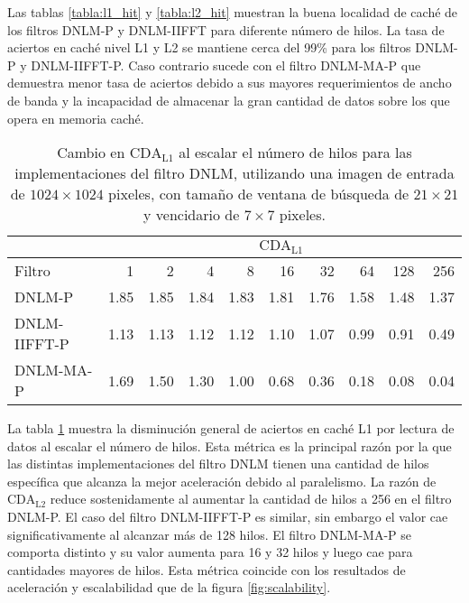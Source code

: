 Las tablas \ref{tabla:l1_hit} y \ref{tabla:l2_hit} muestran la buena localidad de cach\'e de los filtros DNLM-P y DNLM-IIFFT para diferente n\'umero de hilos. La tasa de aciertos en cach\'e nivel L1 y L2 se mantiene cerca del 99\%  para los filtros DNLM-P y DNLM-IIFFT-P. Caso contrario sucede con el filtro DNLM-MA-P que demuestra menor tasa de aciertos debido a sus mayores requerimientos de ancho de banda y la incapacidad de almacenar la gran cantidad de datos sobre los que opera en memoria cach\'e. 

\begin{table}[htb]
\centering
\caption[Cambio en la raz\'on de c\'omputo en caché L1 por acceso a datos al escalar el n\'umero de hilos]{Cambio en  $\text{CDA}_\text{L1}$ al escalar el n\'umero de hilos para las implementaciones del filtro DNLM, utilizando una imagen de entrada de $1024 \times 1024$ pixeles, con tama\~no de ventana de búsqueda de $21 \times 21$ y vencidario de $7 \times 7$ pixeles. \label{tabla:cda_l1}}
\begin{tabular}{lrrrrrrrrr}
& \multicolumn{9}{c}{$\text{CDA}_\text{L1}$} \tabularnewline
\hline
 Filtro & 1 & 2 & 4 & 8 & 16 & 32 & 64 & 128 & 256 \tabularnewline
\hline
DNLM-P & 1.85 & 1.85 & 1.84 & 1.83 & 1.81 &	1.76 & 1.58 & 1.48  & 1.37 \tabularnewline
DNLM-IIFFT-P & 1.13	& 1.13 & 1.12 & 1.12 & 1.10 & 1.07 & 0.99 & 0.91 & 0.49 \tabularnewline
DNLM-MA-P & 1.69 & 1.50 & 1.30 & 1.00 & 0.68 & 0.36 & 0.18 & 0.08 & 0.04 \tabularnewline
\end{tabular}
\end{table}

La tabla \ref{tabla:cda_l1} muestra la disminuci\'on general de aciertos en cach\'e L1 por lectura de datos al escalar el n\'umero de hilos. Esta m\'etrica es la principal raz\'on por la que las distintas implementaciones del filtro DNLM tienen una cantidad de hilos espec\'ifica que alcanza la mejor aceleraci\'on debido al paralelismo. La raz\'on de $\text{CDA}_\text{L2}$ reduce sostenidamente al aumentar la cantidad de hilos a 256 en el filtro DNLM-P. El caso del filtro DNLM-IIFFT-P es similar, sin embargo el valor cae significativamente al alcanzar m\'	as de 128 hilos. El filtro DNLM-MA-P se comporta distinto y su valor aumenta para 16 y 32 hilos y luego cae para cantidades mayores de hilos. Esta m\'etrica coincide con los resultados de aceleraci\'on y escalabilidad que de la figura \ref{fig:scalability}.

